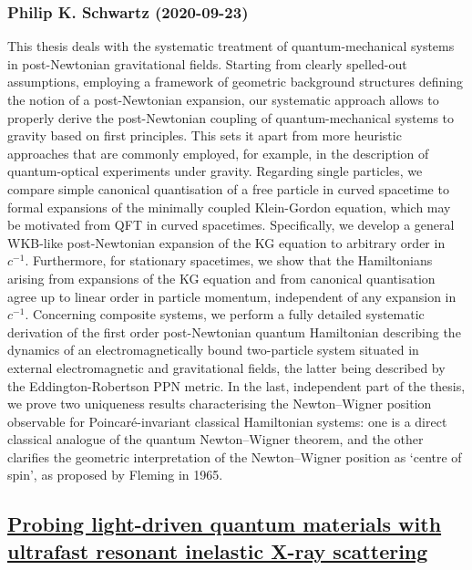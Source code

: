 \subsubsection*{Philip K. Schwartz (2020-09-23)}
This thesis deals with the systematic treatment of quantum-mechanical systems
in post-Newtonian gravitational fields. Starting from clearly spelled-out
assumptions, employing a framework of geometric background structures defining
the notion of a post-Newtonian expansion, our systematic approach allows to
properly derive the post-Newtonian coupling of quantum-mechanical systems to
gravity based on first principles. This sets it apart from more heuristic
approaches that are commonly employed, for example, in the description of
quantum-optical experiments under gravity.
  Regarding single particles, we compare simple canonical quantisation of a
free particle in curved spacetime to formal expansions of the minimally coupled
Klein-Gordon equation, which may be motivated from QFT in curved spacetimes.
Specifically, we develop a general WKB-like post-Newtonian expansion of the KG
equation to arbitrary order in $c^{-1}$. Furthermore, for stationary
spacetimes, we show that the Hamiltonians arising from expansions of the KG
equation and from canonical quantisation agree up to linear order in particle
momentum, independent of any expansion in $c^{-1}$.
  Concerning composite systems, we perform a fully detailed systematic
derivation of the first order post-Newtonian quantum Hamiltonian describing the
dynamics of an electromagnetically bound two-particle system situated in
external electromagnetic and gravitational fields, the latter being described
by the Eddington-Robertson PPN metric.
  In the last, independent part of the thesis, we prove two uniqueness results
characterising the Newton--Wigner position observable for Poincar\'e-invariant
classical Hamiltonian systems: one is a direct classical analogue of the
quantum Newton--Wigner theorem, and the other clarifies the geometric
interpretation of the Newton--Wigner position as `centre of spin', as proposed
by Fleming in 1965.

\subsection*{\href{http://arxiv.org/abs/2009.11315v1}{Probing light-driven quantum materials with ultrafast resonant inelastic  X-ray scattering}}

